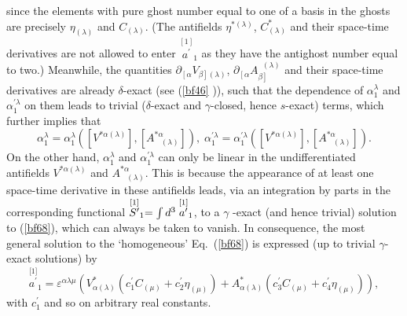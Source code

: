\documentclass[a4paper,11pt]{article}
\begin{document}
since the elements with pure ghost number equal to one of a basis in the
ghosts are precisely $\eta _{(\lambda )}$ and $C_{(\lambda )}$. (The
antifields $\eta ^{*(\lambda )}$, $C_{(\lambda )}^{*}$ and their space-time
derivatives are not allowed to enter $\stackrel{[1]}{a^{\prime }}_{1}$ as
they have the antighost number equal to two.) Meanwhile, the quantities $%
\partial _{\left[ \alpha \right. }V_{\left. \beta \right] (\lambda )}$, $%
\partial _{\left[ \alpha \right. }A_{\left. \beta \right] }^{\;\;(\lambda )}$
and their space-time derivatives are already $\delta $-exact (see (\ref{bf46}%
)), such that the dependence of $\alpha _{1}^{\lambda }$ and $\alpha
_{1}^{\prime \lambda }$ on them leads to trivial ($\delta $-exact and $%
\gamma $-closed, hence $s$-exact) terms, which further implies that
\begin{equation}
\alpha _{1}^{\lambda }=\alpha _{1}^{\lambda }\left( \left[ V^{*\alpha
(\lambda )}\right] ,\left[ A_{\;\;\;(\lambda )}^{*\alpha }\right] \right)
,\;\alpha _{1}^{\prime \lambda }=\alpha _{1}^{\prime \lambda }\left( \left[
V^{*\alpha (\lambda )}\right] ,\left[ A_{\;\;\;(\lambda )}^{*\alpha }\right]
\right) .  \label{bf70}
\end{equation}
On the other hand, $\alpha _{1}^{\lambda }$ and $\alpha _{1}^{\prime \lambda
}$ can only be linear in the undifferentiated antifields $V^{*\alpha
(\lambda )}$ and $A_{\;\;\;(\lambda )}^{*\alpha }$. This is because the
appearance of at least one space-time derivative in these antifields leads,
via an integration by parts in the corresponding functional $\stackrel{[1]}{%
S^{\prime }}_{1}=\int d^{3}\stackrel{[1]}{a^{\prime }}_{1}$, to a $\gamma $%
-exact (and hence trivial) solution to (\ref{bf68}), which can always be
taken to vanish. In consequence, the most general solution to the
`homogeneous' Eq.~(\ref{bf68}) is expressed (up to trivial $\gamma $-exact
solutions) by
\begin{equation}
\stackrel{\lbrack 1]}{a^{\prime }}_{1}=\varepsilon ^{\alpha \lambda \mu
}\left( V_{\alpha (\lambda )}^{*}\left( c_{1}^{\prime }C_{(\mu
)}+c_{2}^{\prime }\eta _{(\mu )}\right) +A_{\alpha (\lambda )}^{*}\left(
c_{3}^{\prime }C_{(\mu )}+c_{4}^{\prime }\eta _{(\mu )}\right) \right) ,
\label{bf71}
\end{equation}
with $c_{1}^{\prime }$ and so on arbitrary real constants.
\end{document}
